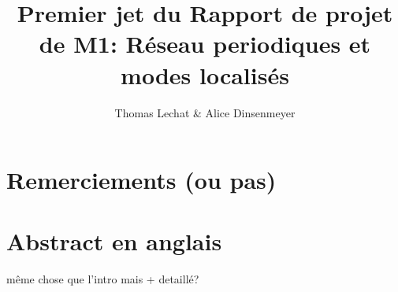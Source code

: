 \documentclass[a4paper]{report}
\title{Premier jet du Rapport de projet de M1: Réseau periodiques et modes localisés }
\author{Thomas Lechat \& Alice Dinsenmeyer}
\begin{document}
\maketitle
\tableofcontents

\chapter*{Remerciements (ou pas)}

\chapter*{Abstract en anglais}
même chose que l'intro mais + detaillé?







\end{document}
